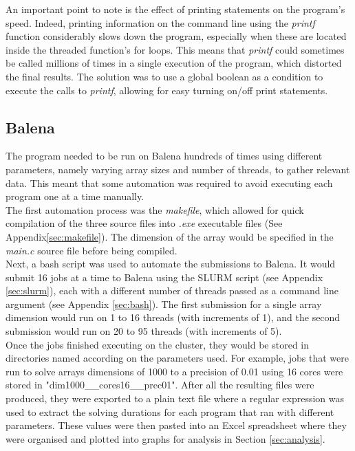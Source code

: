 \documentclass[letterpaper,12pt]{article}
\begin{document}
An important point to note is the effect of printing statements on the program's speed. Indeed, printing information on the command line using the \textit{printf} function considerably slows down the program, especially when these are located inside the threaded function's for loops. This means that \textit{printf} could sometimes be called millions of times in a single execution of the program, which distorted the final results. The solution was to use a global boolean as a condition to execute the calls to \textit{printf}, allowing for easy turning on/off print statements. 

\subsection{Balena}

The program needed to be run on Balena hundreds of times using different parameters, namely varying array sizes and number of threads, to gather relevant data. This meant that some automation was required to avoid executing each program one at a time manually.\\

The first automation process was the \textit{makefile}, which allowed for quick compilation of the three source files into \textit{.exe} executable files (See Appendix\ref{sec:makefile}). The dimension of the array would be specified in the \textit{main.c} source file before being compiled.\\

Next, a bash script was used to automate the submissions to Balena. It would submit 16 jobs at a time to Balena using the SLURM script (see Appendix \ref{sec:slurm}), each with a different number of threads passed as a command line argument (see Appendix \ref{sec:bash}). The first submission for a single array dimension would run on 1 to 16 threads (with increments of 1), and the second submission would run on 20 to 95 threads (with increments of 5).\\

Once the jobs finished executing on the cluster, they would be stored in directories named according on the parameters used. For example, jobs that were run to solve arrays dimensions of 1000 to a precision of 0.01 using 16 cores were stored in "dim1000\_\_cores16\_\_prec01". After all the resulting files were produced, they were exported to a plain text file where a regular expression was used to extract the solving durations for each program that ran with different parameters. These values were then pasted into an Excel spreadsheet where they were organised and plotted into graphs for analysis in Section \ref{sec:analysis}.\\
\end{document}
